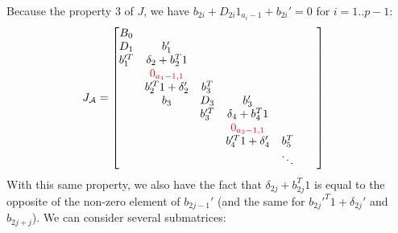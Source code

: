 \documentclass[]{article}
\newcommand{\BIN}{\begin{bmatrix}}
\newcommand{\BOUT}{\end{bmatrix}}
\newcommand{\cred}[1]{\textcolor{red}{#1}}
\begin{document}
Because the property $3$ of $J$, we have $b_{2i} + D_{2i} 1_{a_i-1} + b_{2i}' = 0$ for $i=1..p-1$:
\begin{align*}
&J_\mathcal{A} = 
\BIN
    B_0    &                      &        &                      &        &                                &            \\
    D_1    & b_1'                 &        &                      &        &                                &            \\
    b_1'^T & \delta_2 + b_2^T 1   &        &                      &        &                                &            \\
           & \cred{0_{a_1-1,1}}   &        &                      &        &                                &            \\
           & b_2'^T 1 + \delta_2' & b_3^T  &                      &        &                                &            \\
           & b_3                  & D_3    & b_3'                 &        &                                &            \\
           &                      & b_3'^T & \delta_4 + b_4^T 1   &        &                                &            \\
           &                      &        & \cred{0_{a_2-1,1}}   &        &                                &            \\
           &                      &        & b_4'^T 1 + \delta_4' & b_5^T  &                                &            \\
           &                      &        &                      & \ddots &                                &            \\
  \BOUT
\end{align*}
With this same property, we also have the fact that $\delta_{2j} + b_{2j}^T 1$ is equal to the opposite of the non-zero element of $b_{2j-1}'$ (and the same for $b_{2j}'^T 1 + \delta_{2j}'$ and $b_{2j+j}$).
We can consider several submatrices:
\end{document}

